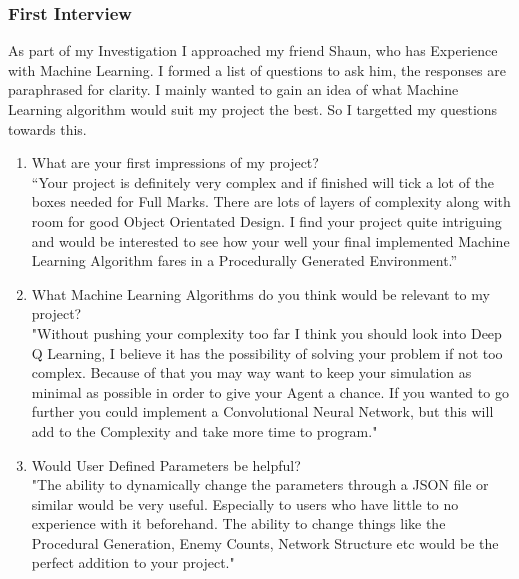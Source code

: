 \begin{flushleft}
            \subsubsection{First Interview}
                \large
                As part of my Investigation I approached my friend Shaun, who has Experience with Machine Learning.
                I formed a list of questions to ask him, the responses are paraphrased for clarity. I mainly wanted to gain an idea of 
                what Machine Learning algorithm would suit my project the best. So I targetted my questions towards this. \\
                \vspace{0.2cm}
                \begin{enumerate}
                    \item {\large What are your first impressions of my project?} \\
                    \vspace{0.2cm}
                    “Your project is definitely very complex and if finished will tick a lot of the boxes needed for Full Marks. There are lots
                    of layers of complexity along with room for good Object Orientated Design. I find your project quite intriguing and would be
                    interested to see how your well your final implemented Machine Learning Algorithm fares in a Procedurally Generated Environment.”

                    \item {\large What Machine Learning Algorithms do you think would be relevant to my project?} \\
                    \vspace{0.2cm}
                    "Without pushing your complexity too far I think you should look into Deep Q Learning, I believe it has the
                    possibility of solving your problem if not too complex. Because of that you may way want to keep your simulation as minimal
                    as possible in order to give your Agent a chance. If you wanted to go further you could implement a Convolutional Neural Network, 
                    but this will add to the Complexity and take more time to program."

                    \item {\large Would User Defined Parameters be helpful?} \\
                    \vspace{0.2cm}
                    "The ability to dynamically change the parameters through a JSON file or similar would be very useful. Especially to users who
                    have little to no experience with it beforehand. The ability to change things like the Procedural Generation, Enemy Counts, 
                    Network Structure etc would be the perfect addition to your project."


\end{enumerate}
\end{flushleft}
